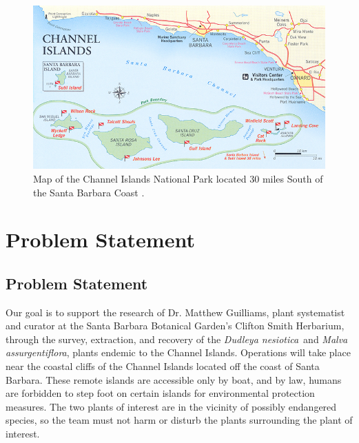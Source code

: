 \documentclass{wrcecapstone}
\newcommand{\Dudleyanesiotica}{\emph{Dudleya nesiotica}}
\newcommand{\Malvaassurgentiflora}{\emph{Malva assurgentiflora}}
\begin{document}
\begin{figure}
\begin{center}
\includegraphics[width=0.8\columnwidth]{figures/fig4-map.png}
\end{center}
\caption{Map of the Channel Islands National Park located 30 miles South of the Santa Barbara Coast \cite{nps2019submerged}.}
\label{fig:1.2.2}
\end{figure}






\section{Problem Statement}
\subsection{Problem Statement}
Our goal is to support the research of Dr. Matthew Guilliams, plant systematist and curator at the Santa Barbara Botanical Garden's Clifton Smith Herbarium, through the survey, extraction, and recovery of the \Dudleyanesiotica\ and \Malvaassurgentiflora, plants endemic to the Channel Islands. Operations will take place near the coastal cliffs of the Channel Islands located off the coast of Santa Barbara. These remote islands are accessible only by boat, and by law, humans are forbidden to step foot on certain islands for environmental protection measures. The two plants of interest are in the vicinity of possibly endangered species, so the team must not harm or disturb the plants surrounding the plant of interest. 
\end{document}
